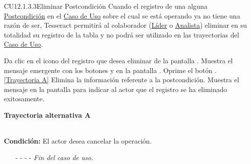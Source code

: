 	\begin{UseCase}{CU12.1.3.3}{Eliminar Postcondición}{
		Cuando el registro de una  alguna \hyperlink{entidadPostcondicion}{Postcondición} en el \hyperlink{casoUso}{Caso de Uso} sobre el cual se está operando ya no tiene una razón de ser, Tesseract permitirá al colaborador (\hyperlink{jefe}{Líder} o \hyperlink{analista}{Analista}) eliminar en su totalidad su registro de la tabla y no podrá ser utilizado en las trayectorias del \hyperlink{casoUso}{Caso de Uso}.
	}
\end{UseCase}
\begin{UCtrayectoria}
	\UCpaso[\UCactor] Da clic en el icono \eliminar del registro que desea eliminar de la pantalla .
	\UCpaso[\UCsist] Muestra el mensaje emergente  con los botones  y  en la pantalla .
	\UCpaso[\UCactor] Oprime el botón . \hyperlink{CU12-1-3-3:TAA}{[Trayectoria A]}
	\UCpaso[\UCsist] Elimina la información referente a la postcondición.
	\UCpaso[\UCsist] Muestra el mensaje  en la pantalla  para indicar al actor que el registro se ha eliminado exitosamente.
\end{UCtrayectoria}		
\hypertarget{CU12-1-3-3:TAA}{\textbf{Trayectoria alternativa A}}\\
\noindent \textbf{Condición:} El actor desea cancelar la operación.
\begin{enumerate}
	\UCpaso[\UCactor] Solicita cancelar la operación oprimiendo el botón  de la pantalla .
	\UCpaso[\UCsist] Muestra la pantalla .
	\item[- -] - - {\em {Fin del caso de uso}}.%
\end{enumerate}
